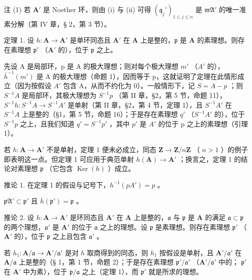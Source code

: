 注 (1) 若 \(\mathbf{A}'\) 是 Noether 环，则由 (i) 与 (ii) 可得 \((\mathfrak{q}_j')_{1 \leqslant j \leqslant n}\) 是 \(\mathfrak{mA}'\) 的唯一准素分解（第 IV 章，§ 2，第 3 节）。

定理 1. 设 \(h: \mathbf{A} \to \mathbf{A}'\) 是单环同态且 \(\mathbf{A}'\) 在 \(\mathbf{A}\) 上是整的，\(\mathfrak{p}\) 是 \(\mathbf{A}\) 的素理想。则存在素理想 \(\mathfrak{p}'\) （\(\mathbf{A}'\) 的），位于 \(\mathfrak{p}\) 之上。

先设 A 是局部环，p 是 A 的极大理想；则对每个极大理想 \(m'\) （\(A'\) 的），\(\bar{h}^{-1}(m')\) 是 A 的极大理想（命题 1），因而等于 p，这就证明了定理在此情形成立（因为按假设 \(A'\) 包含 A，从而不约化为 0）。一般情形下，记 \(S = A - p\) ；则 \(S^{-1}A\) 是局部环，其极大理想为 \(S^{-1}p\) （第 II 章，§2，第 5 节，命题 11），\(S^{-1}h: S^{-1}A \to S^{-1}A'\) 是单射（第 II 章，§2，第 4 节，定理 1），且 \(S^{-1}A'\) 在 \(S^{-1}A\) 上是整的（§1，第 5 节，命题 16）；于是存在素理想 \(q'\) （\(S^{-1}A'\) 的），位于 \(S^{-1}p\) 之上，且我们知道 \(q' = S^{-1}p'\) ，其中 \(p'\) 是 \(A'\) 的位于 p 之上的素理想（引理 1）。

若 \(h: \mathbf{A} \to \mathbf{A}'\) 不是单射，定理 1 便未必成立，同态 \(\mathbf{Z} \to \mathbf{Z}/n\mathbf{Z}\) （ \(n > 1\) ）的例子即表明这一点。但定理 1 可应用于典范单射 \(h(\mathbf{A}) \to \mathbf{A}'\) ；换言之，定理 1 的结论对素理想 \(\mathfrak{p}\) （它包含 \(\operatorname{Ker}(h)\) ）成立。

推论 1. 在定理 1 的假设与记号下，\(h^{-1}(pA') = p\) 。

\(\mathfrak{pA}' \subset \mathfrak{p}'\) 且 \(\overline{h}(\mathfrak{p}') = \mathfrak{p}\) 。

推论 2. 设 \(h: \mathbf{A} \to \mathbf{A}'\) 是环同态且 \(\mathbf{A}'\) 在 \(\mathbf{A}\) 上是整的，\(\mathfrak{a}\) 与 \(\mathfrak{p}\) 是 \(\mathbf{A}\) 的满足 \(\mathfrak{a} \subset \mathfrak{p}\) 的两个理想，\(\mathfrak{a}'\) 是 \(\mathbf{A}'\) 的位于 \(\mathfrak{a}\) 之上的理想。设 \(\mathfrak{p}\) 是素理想。则存在素理想 \(\mathfrak{p}'\) （\(\mathbf{A}'\) 的），位于 \(\mathfrak{p}\) 之上且包含 \(\mathfrak{a}'\) 。

若 \(h_1 \colon \mathbf{A} / \mathfrak{a} \to \mathbf{A}' / \mathfrak{a}'\) 是对 \(h\) 取商得到的同态，则 \(h_1\) 按假设是单射，且 \(\mathbf{A}' / \mathfrak{a}'\) 在 \(\mathbf{A} / \mathfrak{a}\) 上是整的（§ 1，第 1 节，命题 2）；于是存在素理想 \(\mathfrak{p}' / \mathfrak{a}'\) （\(\mathbf{A}' / \mathfrak{a}'\) 中的； \(\mathfrak{p}'\) 在 \(\mathbf{A}'\) 中为素），位于 \(\mathfrak{p} / \mathfrak{a}\) 之上（定理 1），而 \(\mathfrak{p}'\) 就是所求的理想。

